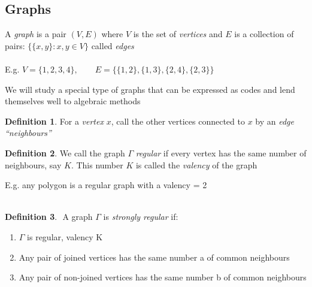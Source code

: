 \documentclass[]{article}
\theoremstyle{definition}
\newtheorem*{defn}{Definition}
\theoremstyle{remark}
\numberwithin{equation}{section}
\begin{document}
\subsection{Graphs}
	A \emph{graph} is a pair $(V, E)$ where $V$ is the set of \emph{vertices} and $E$ is a collection of pairs: $\{\{x,y\}: x,y \in V\}$ called \emph{edges}\\
	\\
	E.g. $V = \{1,2,3,4\}, \qquad E = \{\{1,2\}, \{1,3\}, \{2,4\}, \{2,3\}\}$\\


	We will study a special type of graphs that can be expressed as codes and lend themselves well to algebraic methods\\
	\begin{defn}
	For a \emph{vertex} $x$, call the other vertices connected to $x$ by an \emph{edge} \emph{``neighbours''}
	\end{defn}

	\begin{defn}
	We call the graph $\Gamma$ \emph{regular} if every vertex has the same number of neighbours, say $K$. This number $K$ is called the \emph{valency} of the graph
	\end{defn}
	E.g. any polygon is a regular graph with a valency = 2\\
	\\

	\begin{defn}
		 A graph $\Gamma$ is \emph{strongly regular} if:
		\begin{enumerate}
		\item $\Gamma$ is regular, valency K
		\item Any pair of joined vertices has the same number a of common neighbours
		\item Any pair of non-joined vertices has the same number b of common neighbours
		\end{enumerate}
	\end{defn}
\end{document}
